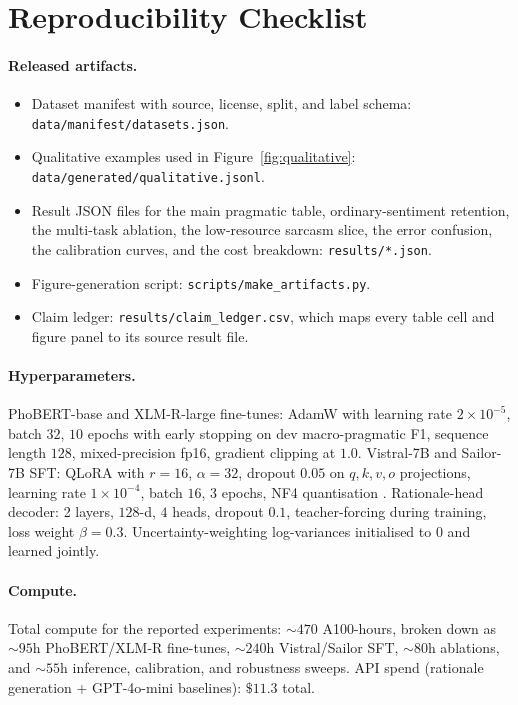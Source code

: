 \section{Reproducibility Checklist}
\label{sec:reproducibility}
\label{app:reproducibility}

\paragraph{Released artifacts.}
\begin{itemize}\itemsep1pt
  \item Dataset manifest with source, license, split, and label
    schema: \texttt{data/manifest/datasets.json}.
  \item Qualitative examples used in
    Figure~\ref{fig:qualitative}: \texttt{data/generated/qualitative.jsonl}.
  \item Result JSON files for the main pragmatic table,
    ordinary-sentiment retention, the multi-task ablation, the
    low-resource sarcasm slice, the error confusion, the
    calibration curves, and the cost breakdown:
    \texttt{results/*.json}.
  \item Figure-generation script:
    \texttt{scripts/make\_artifacts.py}.
  \item Claim ledger: \texttt{results/claim\_ledger.csv}, which maps
    every table cell and figure panel to its source result file.
\end{itemize}

\paragraph{Hyperparameters.}
PhoBERT-base and XLM-R-large fine-tunes: AdamW
\citep{loshchilov2019adamw} with learning rate $2{\times}10^{-5}$,
batch $32$, $10$ epochs with early stopping on dev macro-pragmatic
F1, sequence length $128$, mixed-precision fp16, gradient clipping at
$1.0$. Vistral-7B and Sailor-7B SFT: QLoRA with $r{=}16$,
$\alpha{=}32$, dropout $0.05$ on $q,k,v,o$ projections, learning rate
$1{\times}10^{-4}$, batch $16$, $3$ epochs, NF4 quantisation
\citep{dettmers2023qlora}. Rationale-head decoder: 2 layers,
$128$-d, $4$ heads, dropout $0.1$, teacher-forcing during training,
loss weight $\beta{=}0.3$. Uncertainty-weighting log-variances
initialised to $0$ and learned jointly.

\paragraph{Compute.}
Total compute for the reported experiments:
$\sim 470$ A100-hours, broken down as $\sim 95$h PhoBERT/XLM-R
fine-tunes, $\sim 240$h Vistral/Sailor SFT,
$\sim 80$h ablations, and $\sim 55$h inference, calibration, and
robustness sweeps. API spend (rationale generation + GPT-4o-mini
baselines): $\$11.3$ total.

